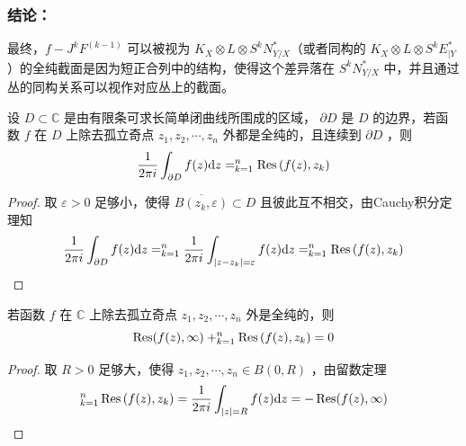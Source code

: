 \documentclass[lang=cn,zihao=5,twoside,fontset=none]{textbook}
\let\sum\relax
\begin{document}
\subsubsection{结论：}
最终，$f - J^k F^{(k-1)}$ 可以被视为 $K_X \otimes L \otimes S^k N_{Y/X}^*$（或者同构的 $K_X \otimes L \otimes S^k E_{\mid Y}^*$）的全纯截面是因为短正合列中的结构，使得这个差异落在 $S^k N_{Y/X}^*$ 中，并且通过丛的同构关系可以视作对应丛上的截面。

\begin{theorem}[留数定理]\label{thm:residue theorem}
    设 $D \subset \mathbb{C}$ 是由有限条可求长简单闭曲线所围成的区域， $\partial D$ 是 $D$ 的边界，若函数 $f$ 在 $D$ 上除去孤立奇点 $z_1, z_2, \cdots, z_n$ 外都是全纯的，且连续到 $\partial D$ ，则
$$
\frac{1}{2 \pi i} \int_{\partial D} f(z) \mathrm{d} z=\sum_{k=1}^n \operatorname{Res}\left(f(z), z_k\right)
$$

\end{theorem}
    
\begin{proof}
    取 $\varepsilon>0$ 足够小，使得 $\overline{B\left(z_k, \varepsilon\right)} \subset D$ 且彼此互不相交，由Cauchy积分定理知
$$
\frac{1}{2 \pi i} \int_{\partial D} f(z) \mathrm{d} z=\sum_{k=1}^n \frac{1}{2 \pi i} \int_{\left|z-z_k\right|=\varepsilon} f(z) \mathrm{d} z=\sum_{k=1}^n \operatorname{Res}\left(f(z), z_k\right)
$$
\end{proof}

\begin{theorem}[另一形式的留数定理]\label{thm:2residue}
    若函数 $f$ 在 $\mathbb{C}$ 上除去孤立奇点 $z_1, z_2, \cdots, z_n$ 外是全纯的，则
$$
\operatorname{Res}(f(z), \infty)+\sum_{k=1}^n \operatorname{Res}\left(f(z), z_k\right)=0
$$

\end{theorem}

    \begin{proof}
        取 $R>0$ 足够大，使得 $z_1, z_2, \cdots, z_n \in B(0, R)$ ，由留数定理
$$
\sum_{k=1}^n \operatorname{Res}\left(f(z), z_k\right)=\frac{1}{2 \pi i} \int_{|z|=R} f(z) \mathrm{d} z=-\operatorname{Res}(f(z), \infty)
$$
    \end{proof}



%
\printbibliography[heading=bibintoc]
\end{document}
